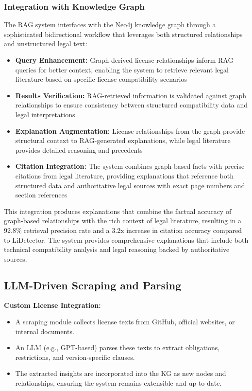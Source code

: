 \subsubsection{Integration with Knowledge Graph}
The RAG system interfaces with the Neo4j knowledge graph through a sophisticated bidirectional workflow that leverages both structured relationships and unstructured legal text:

\begin{itemize}
    \item \textbf{Query Enhancement:} Graph-derived license relationships inform RAG queries for better context, enabling the system to retrieve relevant legal literature based on specific license compatibility scenarios
    \item \textbf{Results Verification:} RAG-retrieved information is validated against graph relationships to ensure consistency between structured compatibility data and legal interpretations
    \item \textbf{Explanation Augmentation:} License relationships from the graph provide structural context to RAG-generated explanations, while legal literature provides detailed reasoning and precedents
    \item \textbf{Citation Integration:} The system combines graph-based facts with precise citations from legal literature, providing explanations that reference both structured data and authoritative legal sources with exact page numbers and section references
\end{itemize}

This integration produces explanations that combine the factual accuracy of graph-based relationships with the rich context of legal literature, resulting in a 92.8\% retrieval precision rate and a 3.2x increase in citation accuracy compared to LiDetector. The system provides comprehensive explanations that include both technical compatibility analysis and legal reasoning backed by authoritative sources.

\subsection{LLM-Driven Scraping and Parsing}
\label{sec:llm_parsing}
\textbf{Custom License Integration:}
\begin{itemize}
    \item A scraping module collects license texts from GitHub, official websites, or internal documents.
    \item An LLM (e.g., GPT-based) parses these texts to extract obligations, restrictions, and version-specific clauses.
    \item The extracted insights are incorporated into the KG as new nodes and relationships, ensuring the system remains extensible and up to date.
\end{itemize}

